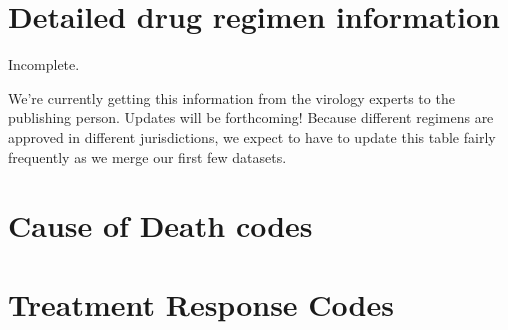 \documentclass{article}
\begin{document}
\FloatBarrier
\begin{appendices}

\newpage
\section{Detailed drug regimen information}
\label{apx:drug-regimens}

Incomplete.

We're currently getting this information from the virology experts to
the publishing person. Updates will be forthcoming! Because different
regimens are approved in different jurisdictions, we expect to have to
update this table fairly frequently as we merge our first few
datasets.


\newpage
\section{Cause of Death codes}
\label{apx:cod}



\newpage
\section{Treatment Response Codes}
\label{apx:response}


\end{appendices}
\end{document}

